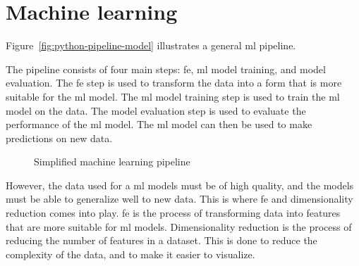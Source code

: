 \section{Machine learning}\label{sec:machine-learning}
Figure~\ref{fig:python-pipeline-model} illustrates a general \gls{ml} pipeline.

The pipeline consists of four main steps: \gls{fe}, \gls{ml} model training, and model evaluation. The \gls{fe} step is used to transform the data into a form that is more suitable for the \gls{ml} model. The \gls{ml} model training step is used to train the \gls{ml} model on the data. The model evaluation step is used to evaluate the performance of the \gls{ml} model. The \gls{ml} model can then be used to make predictions on new data.


\begin{figure}[htb!]
    \centering
    \caption{Simplified machine learning pipeline}
    \label{fig:basic-machine-learning-pipeline}
\end{figure}


However, the data used for a \gls{ml} models must be of high quality, and the models must be able to generalize well to new data. This is where \gls{fe} and dimensionality reduction comes into play. \gls{fe} is the process of transforming data into features that are more suitable for \gls{ml} models. Dimensionality reduction is the process of reducing the number of features in a dataset. This is done to reduce the complexity of the data, and to make it easier to visualize.
